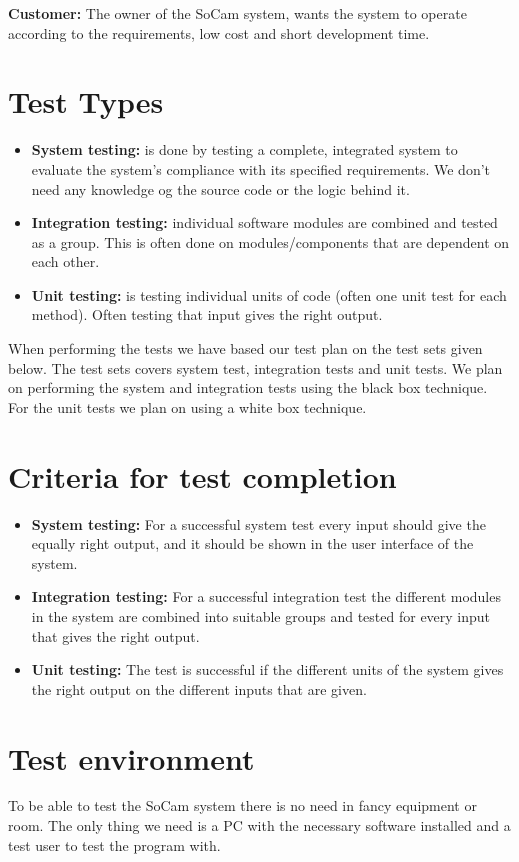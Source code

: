 		{\bf Customer:} The owner of the SoCam system, wants the system to operate according to the requirements, low cost and short development time.


	\section {Test Types}

		\begin{itemize}
			\item {\bf System testing:} is done by testing a complete, integrated system to 
			evaluate the system's compliance with its specified requirements. We don’t need 
			any knowledge og the source code or the logic behind it.
			\item {\bf Integration testing:} individual software modules are combined and tested as a group. 
			This is often done on modules/components that are dependent on each other. 
			\item {\bf Unit testing:} is testing individual units of code (often one unit test for each method). 
			Often testing that input gives the right output. 
		\end{itemize}

	When performing the tests we have based our test plan on the test sets given below. The test sets covers system test, integration tests and unit tests. We plan on performing the system and integration tests using the black box technique. For the unit tests we plan on using a white box technique. 

	\section{Criteria for test completion}

		\begin{itemize}
			\item {\bf System testing:} For a successful system test every input should give the equally right 
			output, and it should be shown in the user interface of the system. 
			\item {\bf Integration testing:} For a successful integration test the different modules in the 
			system are combined into suitable groups and tested for every input that gives the right output.  
			\item {\bf Unit testing:} The test is successful if the different units of the system gives the 
			right output on the different inputs that are given. 
		\end{itemize}

	\section {Test environment}

	To be able to test the SoCam system there is no need in fancy equipment or room. The only thing we need 
	is a PC with the necessary software installed and a test user to test the program with.



	